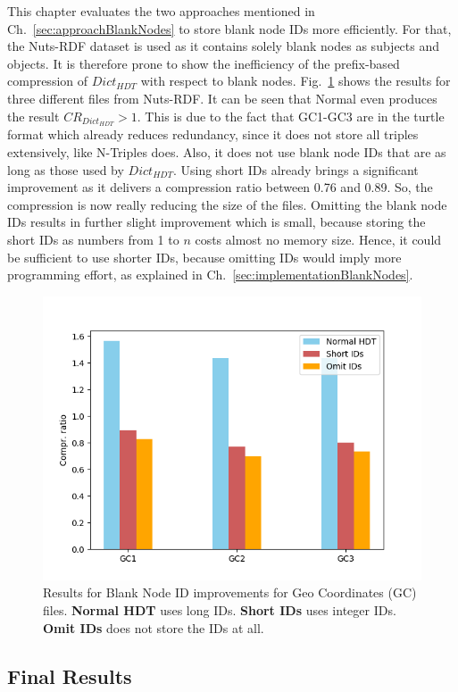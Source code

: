 This chapter evaluates the two approaches mentioned in Ch.~\ref{sec:approachBlankNodes} to store blank node IDs more efficiently. For that, the Nuts-RDF dataset is used as it contains solely blank nodes as subjects and objects. It is therefore prone to show the inefficiency of the prefix-based compression of $Dict_{HDT}$ with respect to blank nodes. Fig.~\ref{fig:blanknodes} shows the results for three different files from Nuts-RDF. It can be seen that Normal \DHDT{} even produces the result $CR_{Dict_{HDT}}>1$. This is due to the fact that GC1-GC3 are in the turtle format which already reduces redundancy, since it does not store all triples extensively, like N-Triples does. Also, it does not use blank node IDs that are as long as those used by $Dict_{HDT}$. Using short IDs already brings a significant improvement as it delivers a compression ratio between 0.76 and 0.89. So, the compression is now really reducing the size of the files. Omitting the blank node IDs results in further slight improvement which is small, because storing the short IDs as numbers from 1 to $n$ costs almost no memory size. Hence, it could be sufficient to use shorter IDs, because omitting IDs would imply more programming effort, as explained in Ch.~\ref{sec:implementationBlankNodes}.


\begin{figure}
	\centering
	\includegraphics[width=0.8\linewidth]{figures/4_evaluation/blankNodes}
	\caption{Results for Blank Node ID improvements for Geo Coordinates (GC) files. \textbf{Normal HDT} uses long IDs. \textbf{Short IDs} uses integer IDs. \textbf{Omit IDs} does not store the IDs at all.}
	\label{fig:blanknodes}
\end{figure}


\subsection{Final Results}\label{sec:evaluationFinal}

